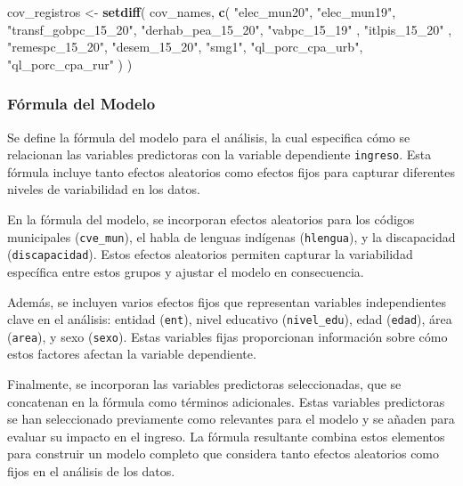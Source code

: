 \documentclass[
  12pt,
]{book}
\newenvironment{Shaded}{\begin{snugshade}}{\end{snugshade}}
\newcommand{\FunctionTok}[1]{\textcolor[rgb]{0.13,0.29,0.53}{\textbf{#1}}}
\newcommand{\NormalTok}[1]{#1}
\newcommand{\OtherTok}[1]{\textcolor[rgb]{0.56,0.35,0.01}{#1}}
\newcommand{\StringTok}[1]{\textcolor[rgb]{0.31,0.60,0.02}{#1}}
\begin{document}
\begin{Shaded}
\begin{Highlighting}[]
\NormalTok{cov\_registros }\OtherTok{\textless{}{-}} \FunctionTok{setdiff}\NormalTok{(}
\NormalTok{  cov\_names,}
  \FunctionTok{c}\NormalTok{(}
    \StringTok{"elec\_mun20"}\NormalTok{,}
    \StringTok{"elec\_mun19"}\NormalTok{,}
    \StringTok{"transf\_gobpc\_15\_20"}\NormalTok{,}
    \StringTok{"derhab\_pea\_15\_20"}\NormalTok{,}
    \StringTok{"vabpc\_15\_19"}\NormalTok{ ,}
    \StringTok{"itlpis\_15\_20"}\NormalTok{  ,}
    \StringTok{"remespc\_15\_20"}\NormalTok{,}
    \StringTok{"desem\_15\_20"}\NormalTok{,}
    \StringTok{"smg1"}\NormalTok{,}
    \StringTok{"ql\_porc\_cpa\_urb"}\NormalTok{,}
    \StringTok{"ql\_porc\_cpa\_rur"}
\NormalTok{  )}
\NormalTok{)}
\end{Highlighting}
\end{Shaded}

\hypertarget{fuxf3rmula-del-modelo}{%
\subsubsection*{Fórmula del Modelo}\label{fuxf3rmula-del-modelo}}

Se define la fórmula del modelo para el análisis, la cual especifica cómo se relacionan las variables predictoras con la variable dependiente \texttt{ingreso}. Esta fórmula incluye tanto efectos aleatorios como efectos fijos para capturar diferentes niveles de variabilidad en los datos.

En la fórmula del modelo, se incorporan efectos aleatorios para los códigos municipales (\texttt{cve\_mun}), el habla de lenguas indígenas (\texttt{hlengua}), y la discapacidad (\texttt{discapacidad}). Estos efectos aleatorios permiten capturar la variabilidad específica entre estos grupos y ajustar el modelo en consecuencia.

Además, se incluyen varios efectos fijos que representan variables independientes clave en el análisis: entidad (\texttt{ent}), nivel educativo (\texttt{nivel\_edu}), edad (\texttt{edad}), área (\texttt{area}), y sexo (\texttt{sexo}). Estas variables fijas proporcionan información sobre cómo estos factores afectan la variable dependiente.

Finalmente, se incorporan las variables predictoras seleccionadas, que se concatenan en la fórmula como términos adicionales. Estas variables predictoras se han seleccionado previamente como relevantes para el modelo y se añaden para evaluar su impacto en el ingreso. La fórmula resultante combina estos elementos para construir un modelo completo que considera tanto efectos aleatorios como fijos en el análisis de los datos.
\end{document}
